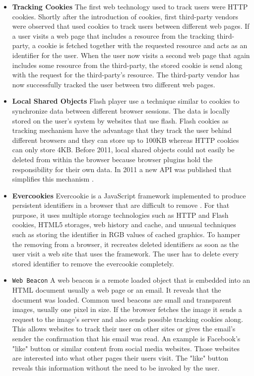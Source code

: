 	\begin{itemize}
		\item \textbf{Tracking Cookies} The first web technology used to track users were HTTP cookies. Shortly after the introduction of cookies, first third-party vendors were observed that used cookies to track users between different web pages. %
		If a user visits a web page that includes a resource from the tracking third-party, a cookie is fetched together with the requested resource and acts as an identifier for the user. When the user now visits a second web page that again includes some resource from the third-party, the stored cookie is send along with the request for the third-party's resource. The third-party vendor has now successfully tracked the user between two different web pages.  
		
		\item \textbf{Local Shared Objects} Flash player use a technique similar to cookies to synchronize data between different browser sessions. The data is locally stored on the user's system by websites that use flash. Flash cookies as tracking mechanism have the advantage that they track the user behind different browsers and they can store up to 100KB whereas HTTP cookies can only store 4KB. Before 2011, local shared objects could not easily be deleted from within the browser because browser plugins hold the responsibility for their own data. In 2011 a new API was published that simplifies this mechanism \cite{mozillaWikiClearPrivacyAPI}.
		
		\item \textbf{Evercookies} Evercookie is a JavaScript framework implemented to produce persistent identifiers in a browser that are difficult to remove \cite{evercookie}. For that purpose, it uses multiple storage technologies such as HTTP and Flash cookies, HTML5 storages, web history and cache, and unusual techniques such as storing the identifier in RGB values of cached graphics. To hamper the removing from a browser, it recreates deleted identifiers as soon as the user visit a web site that uses the framework. The user has to delete every stored identifier to remove the evercookie completely. 
		
		\item \texttt{Web Beacon} A web beacon is a remote loaded object that is embedded into an HTML document usually a web page or an email. It reveals that the document was loaded. Common used beacons are small and transparent images, usually one pixel in size. If the browser fetches the image it sends a request to the image's server and also sends possible tracking cookies along. This allows websites to track their user on other sites or gives the email's sender the confirmation that his email was read. An example is Facebook's "like" button or similar content from social media websites. Those websites are interested into what other pages their users visit. The "like" button reveals this information without the need to be invoked by the user. 
	\end{itemize}



